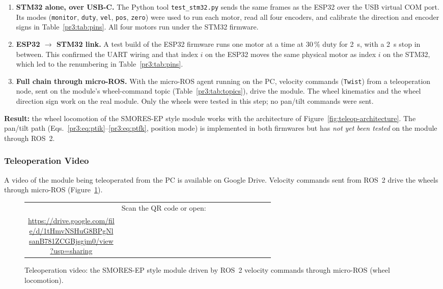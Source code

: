 \documentclass[12pt,a4paper]{article}
\begin{document}
\begin{enumerate}
  \item \textbf{STM32 alone, over USB-C.} The Python tool \texttt{test\_stm32.py} sends the same
        frames as the ESP32 over the USB virtual COM port. Its modes (\texttt{monitor},
        \texttt{duty}, \texttt{vel}, \texttt{pos}, \texttt{zero}) were used to run each motor, read all
        four encoders, and calibrate the direction and encoder signs in Table~\ref{pr3:tab:pins}.
        All four motors run under the STM32 firmware.
  \item \textbf{ESP32 $\rightarrow$ STM32 link.} A test build of the ESP32 firmware runs one
        motor at a time at 30\,\% duty for \SI{2}{s}, with a \SI{2}{s} stop in between. This
        confirmed the UART wiring and that index $i$ on the ESP32 moves the same physical motor
        as index $i$ on the STM32, which led to the renumbering in Table~\ref{pr3:tab:pins}.
  \item \textbf{Full chain through micro-ROS.} With the micro-ROS agent running on the PC,
        velocity commands (\texttt{Twist}) from a teleoperation node, sent on the module's
        wheel-command topic (Table~\ref{pr3:tab:topics}), drive the module. The wheel
        kinematics and the wheel direction sign work on the real module. Only the wheels were tested in this step; no
        pan/tilt commands were sent.
\end{enumerate}

\noindent\textbf{Result:} the wheel locomotion of the SMORES-EP style module works with the
architecture of Figure~\ref{fig:teleop-architecture}. The pan/tilt path (Eqs.~\eqref{pr3:eq:ptik}--\eqref{pr3:eq:ptfk},
position mode) is implemented in both firmwares but has \emph{not yet been tested} on the
module through ROS~2.

\subsubsection{Teleoperation Video}

A video of the module being teleoperated from the PC is available on Google Drive. Velocity
commands sent from ROS~2 drive the wheels through micro-ROS
(Figure~\ref{pr3:fig:video}).

\begin{figure}[H]
\centering
\begin{tabular}{c p{0.62\linewidth}}
\raisebox{-0.5\height}{\href{https://drive.google.com/file/d/1tHmvNSHuG8BPgNlsanB781ZCGBjsgjm0/view?usp=sharing}{\qrcode[nolink,height=2.8cm]{https://drive.google.com/file/d/1tHmvNSHuG8BPgNlsanB781ZCGBjsgjm0/view?usp=sharing}}} &
\raggedright Scan the QR code or open:\\[1mm]
\footnotesize\url{https://drive.google.com/file/d/1tHmvNSHuG8BPgNlsanB781ZCGBjsgjm0/view?usp=sharing}
\end{tabular}
\caption{Teleoperation video: the SMORES-EP style module driven by ROS~2 velocity commands through micro-ROS (wheel locomotion).}
\label{pr3:fig:video}
\end{figure}
\end{document}
